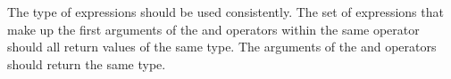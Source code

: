 The type of expressions should be used consistently.  The set of
expressions that make up the first arguments of the 
and  operators within the same 
operator should all return values of the same type. The arguments
of the  and  operators should return the same
type.



\makeatletter
\renewcommand{\thesection}      {\@arabic\c@section}
\renewcommand{\thesubsection}   {\thesection.\@arabic\c@subsection}
\renewcommand{\thesubsubsection}{\thesubsection .\@arabic\c@subsubsection}
\renewcommand{\theparagraph}    {\thesubsubsection.\@arabic\c@paragraph}
\makeatother
